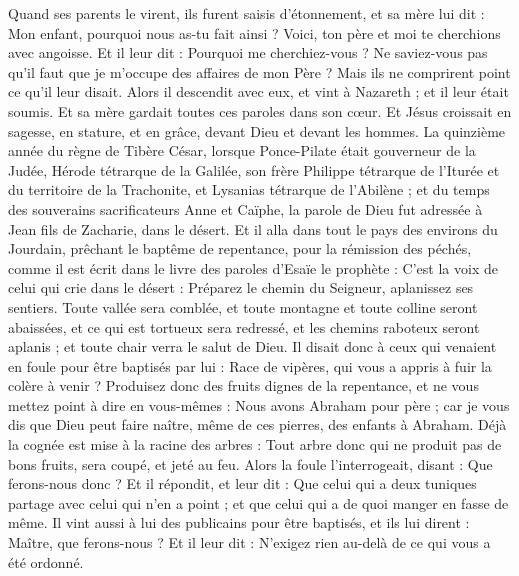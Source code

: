 \begin{multicols}{2}
Quand ses parents le virent, ils furent saisis d’étonnement, et sa mère lui dit : Mon enfant, pourquoi nous as-tu fait ainsi ? Voici, ton père et moi te cherchions avec angoisse.
Et il leur dit : Pourquoi me cherchiez-vous ? Ne saviez-vous pas qu'il faut que je m’occupe des affaires de mon Père ?
Mais ils ne comprirent point ce qu'il leur disait.
Alors il descendit avec eux, et vint à Nazareth ; et il leur était soumis. Et sa mère gardait toutes ces paroles dans son cœur.
Et Jésus croissait en sagesse, en stature, et en grâce, devant Dieu et devant les hommes.
\VerseOne{}La quinzième année du règne de Tibère César, lorsque Ponce-Pilate était gouverneur de la Judée, Hérode tétrarque de la Galilée, son frère Philippe tétrarque de l’Iturée et du territoire de la Trachonite, et Lysanias tétrarque de l’Abilène ;
et du temps des souverains sacrificateurs Anne et Caïphe, la parole de Dieu fut adressée à Jean fils de Zacharie, dans le désert.
Et il alla dans tout le pays des environs du Jourdain, prêchant le baptême de repentance, pour la rémission des péchés,
comme il est écrit dans le livre des paroles d'Esaïe le prophète : C’est la voix de celui qui crie dans le désert : Préparez le chemin du Seigneur, aplanissez ses sentiers.
Toute vallée sera comblée, et toute montagne et toute colline seront abaissées, et ce qui est tortueux sera redressé, et les chemins raboteux seront aplanis ;
et toute chair verra le salut de Dieu.
Il disait donc à ceux qui venaient en foule pour être baptisés par lui : Race de vipères, qui vous a appris à fuir la colère à venir ?
Produisez donc des fruits dignes de la repentance, et ne vous mettez point à dire en vous-mêmes : Nous avons Abraham pour père ; car je vous dis que Dieu peut faire naître, même de ces pierres, des enfants à Abraham.
Déjà la cognée est mise à la racine des arbres : Tout arbre donc qui ne produit pas de bons fruits, sera coupé, et jeté au feu.
Alors la foule l'interrogeait, disant : Que ferons-nous donc ?
Et il répondit, et leur dit : Que celui qui a deux tuniques partage avec celui qui n'en a point ; et que celui qui a de quoi manger en fasse de même.
Il vint aussi à lui des publicains pour être baptisés, et ils lui dirent : Maître, que ferons-nous ?
Et il leur dit : N'exigez rien au-delà de ce qui vous a été ordonné.

\end{multicols}
